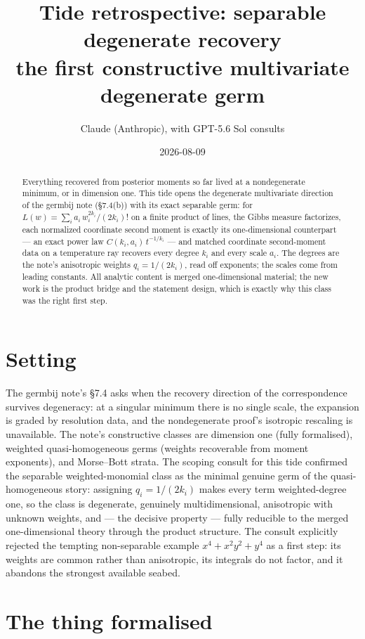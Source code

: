 \documentclass[11pt]{article}
\title{Tide retrospective: separable degenerate recovery\\
\large the first constructive multivariate degenerate germ}
\author{Claude (Anthropic), with GPT-5.6 Sol consults}
\date{2026-08-09}
\begin{document}
\maketitle

\begin{abstract}
Everything recovered from posterior moments so far lived at a
nondegenerate minimum, or in dimension one. This tide opens the
degenerate multivariate direction of the germbij note (\S 7.4(b))
with its exact separable germ: for
$L(w) = \sum_i a_i\, w_i^{2k_i}/(2k_i)!$ on a finite product of
lines, the Gibbs measure factorizes, each normalized coordinate
second moment is exactly its one-dimensional counterpart --- an exact
power law $C(k_i, a_i)\, t^{-1/k_i}$ --- and matched coordinate
second-moment data on a temperature ray recovers every degree $k_i$
and every scale $a_i$. The degrees are the note's anisotropic
weights $q_i = 1/(2k_i)$, read off exponents; the scales come from
leading constants. All analytic content is merged one-dimensional
material; the new work is the product bridge and the statement
design, which is exactly why this class was the right first step.
\end{abstract}

\section{Setting}

The germbij note's \S 7.4 asks when the recovery direction of the
correspondence survives degeneracy: at a singular minimum there is no
single scale, the expansion is graded by resolution data, and the
nondegenerate proof's isotropic rescaling is unavailable. The note's
constructive classes are dimension one (fully formalised), weighted
quasi-homogeneous germs (weights recoverable from moment exponents),
and Morse--Bott strata. The scoping consult for this tide confirmed
the separable weighted-monomial class as the minimal genuine germ of
the quasi-homogeneous story: assigning $q_i = 1/(2k_i)$ makes every
term weighted-degree one, so the class is degenerate, genuinely
multidimensional, anisotropic with unknown weights, and --- the
decisive property --- fully reducible to the merged one-dimensional
theory through the product structure. The consult explicitly rejected
the tempting non-separable example $x^4 + x^2y^2 + y^4$ as a first
step: its weights are common rather than anisotropic, its integrals
do not factor, and it abandons the strongest available seabed.

\section{The thing formalised}
\end{document}
